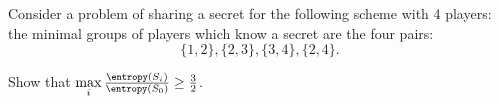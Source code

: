 Consider a problem of sharing a secret for the following scheme with $4$ players: the minimal
groups of players which know a secret are the four pairs:
$$
    \{1, 2\}, \{2, 3\}, \{3, 4\}, \{2, 4\}.
$$

Show that $\max\limits_i \frac{\entropy(S_i)}{\entropy(S_0)} \ge \frac{3}{2}$.